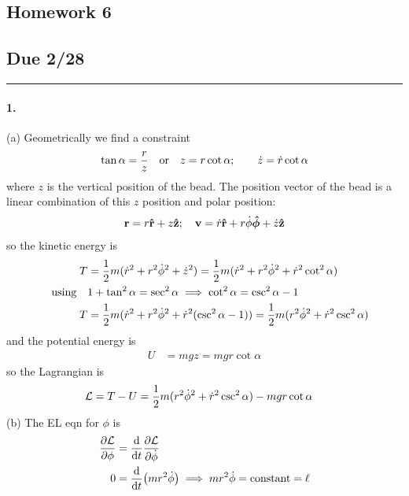 \documentclass[../hw.tex]{subfiles}
\begin{document}
\setcounter{section}{6}
\begin{center}
  \section*{Homework 6} \label{sec:homework5}
  \subsection*{Due 2/28}
\end{center}
\hrule \vspace{10px}

\paragraph*{1.} (a) Geometrically we find a constraint
\begin{align*}
    \tan \alpha = \frac{r}{z} \qor z = r \cot \alpha; \qquad \dot z  = \dot r \cot \alpha
\end{align*}
where $z$ is the vertical position of the bead. The position vector of the bead is a linear
combination of this $z$ position and polar position:
\begin{align*}
    \vb r = r \vu r + z \vu z; \quad \vb v = \dot r \vu r + r\dot \phi \vu*\phi + \dot z \vu z
\end{align*}
so the kinetic energy is
\begin{align*}
    T &= \frac{1}{2} m (\dot r^2 + r^2 \dot \phi^2 + \dot z^2)
        = \frac{1}{2} m (\dot r^2 + r^2 \dot \phi^2 + \dot r^2 \cot^2 \alpha) \\
    \qusing &1 + \tan^2 \alpha = \sec^2 \alpha \implies \cot^2 \alpha = \csc^2 \alpha - 1 \\
    T &= \frac{1}{2} m (\dot r^2 + r^2 \dot \phi^2 + \dot r^2 (\csc^2 \alpha - 1))
        = \frac{1}{2} m (r^2 \dot \phi^2 + \dot r^2 \csc^2 \alpha) \\
\end{align*}
and the potential energy is
\begin{align*}
    U &= mgz = mgr \cot \alpha
\end{align*}
so the Lagrangian is
\begin{align*}
    \mathcal{L} &= T - U = \frac{1}{2} m (r^2 \dot \phi^2 + \dot r^2 \csc^2 \alpha) - mgr \cot \alpha
\end{align*}
(b) The EL eqn for $\phi$ is
\begin{align*}
    \pdv{\mathcal{L}}{\phi} &= \dv{t} \pdv{\mathcal{L}}{\dot \phi} \\
    0 &= \dv{t}(mr^2 \dot \phi) \implies mr^2 \dot \phi = \text{constant} = \ell
\end{align*}
\end{document}
